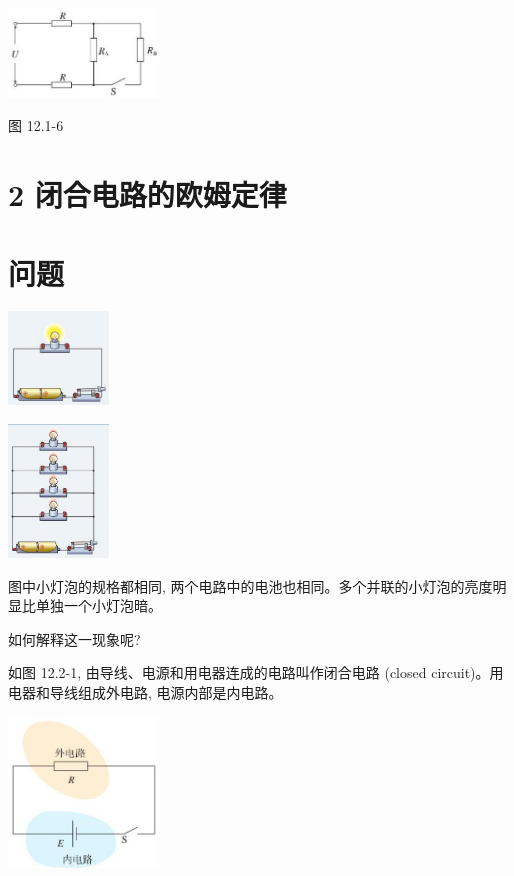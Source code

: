 \documentclass[10pt]{article}
\begin{document}
\begin{center}
\includegraphics[max width=0.3\textwidth]{images/01911d5f-8e38-70c0-b5b8-2b399bd115b6_87_868998.jpg}
\end{center}

图 12.1-6

\section*{2 闭合电路的欧姆定律}

\section*{问题}

\begin{center}
\includegraphics[max width=0.2\textwidth]{images/01911d5f-8e38-70c0-b5b8-2b399bd115b6_88_682693.jpg}
\end{center}

\begin{center}
\includegraphics[max width=0.2\textwidth]{images/01911d5f-8e38-70c0-b5b8-2b399bd115b6_88_455516.jpg}
\end{center}

图中小灯泡的规格都相同, 两个电路中的电池也相同。多个并联的小灯泡的亮度明显比单独一个小灯泡暗。

如何解释这一现象呢?

如图 12.2-1, 由导线、电源和用电器连成的电路叫作闭合电路 (closed circuit)。用电器和导线组成外电路, 电源内部是内电路。

\begin{center}
\includegraphics[max width=0.3\textwidth]{images/01911d5f-8e38-70c0-b5b8-2b399bd115b6_88_158115.jpg}
\end{center}
\end{document}
